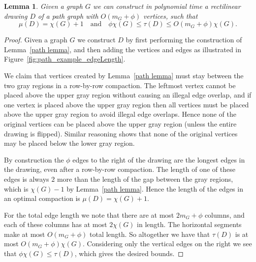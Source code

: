 \documentclass[12pt]{article}
\newtheorem{lemma}[theorem]{Lemma}
\theoremstyle{definitions}
\begin{document}
\begin{lemma}
\label{lem:rxrframe}
Given a graph $G$ we can construct in polynomial time a rectilinear drawing $D$ of a path graph with $O(m_G+\phi)$ vertices, such that
\[
\mu(D) = \chi(G) + 1 \quad\text{and}\quad
\phi \chi(G) \leq \tau(D) \leq O(m_G + \phi) \chi(G).
\]
\end{lemma}
\begin{proof}
Given a graph $G$ we construct $D$ by first performing the construction of Lemma~\ref{path lemma}, and then adding the vertices and edges as illustrated in Figure~\ref{fig:path_example_edgeLength}.

We claim that vertices created by Lemma~\ref{path lemma} must stay between the two gray regions in a row-by-row compaction. The leftmost vertex cannot be placed above the upper gray region without causing an illegal edge overlap, and if one vertex is placed above the upper gray region then all vertices must be placed above the upper gray region to avoid illegal edge overlaps. Hence none of the original vertices can be placed above the upper gray region (unless the entire drawing is flipped). Similar reasoning shows that none of the original vertices may be placed below the lower gray region.

By construction the $\phi$ edges to the right of the drawing are the longest edges in the drawing, even after a row-by-row compaction. The length of one of these edges is always $2$ more than the length of the gap between the gray regions, which is $\chi(G) - 1$ by Lemma~\ref{path lemma}. Hence the length of the edges in an optimal compaction is $\mu(D) = \chi(G) + 1$.

For the total edge length we note that there are at most $2m_G + \phi$ columns, and each of these columns has at most $2\chi(G)$ in length. The horizontal segments make at most $O(m_G + \phi)$ total length. So altogether we have that $\tau(D)$ is at most $O(m_G + \phi) \chi(G)$. Considering only the vertical edges on the right we see that $\phi \chi(G) \leq \tau(D)$, which gives the desired bounds.
\end{proof}
\end{document}
